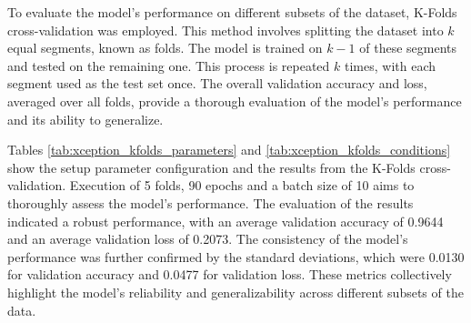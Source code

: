 To evaluate the model's performance on different subsets of the dataset, K-Folds cross-validation was employed. This method involves splitting the dataset into $k$ equal segments, known as folds. The model is trained on $k-1$ of these segments and tested on the remaining one. This process is repeated $k$ times, with each segment used as the test set once. The overall validation accuracy and loss, averaged over all folds, provide a thorough evaluation of the model's performance and its ability to generalize.

Tables \ref{tab:xception_kfolds_parameters} and \ref{tab:xception_kfolds_conditions} show the setup parameter configuration and the results from the K-Folds cross-validation. Execution of 5 folds, 90 epochs and a batch size of 10 aims to thoroughly assess the model's performance. The evaluation of the results indicated a robust performance, with an average validation accuracy of 0.9644 and an average validation loss of 0.2073. The consistency of the model's performance was further confirmed by the standard deviations, which were 0.0130 for validation accuracy and 0.0477 for validation loss. These metrics collectively highlight the model's reliability and generalizability across different subsets of the data.

